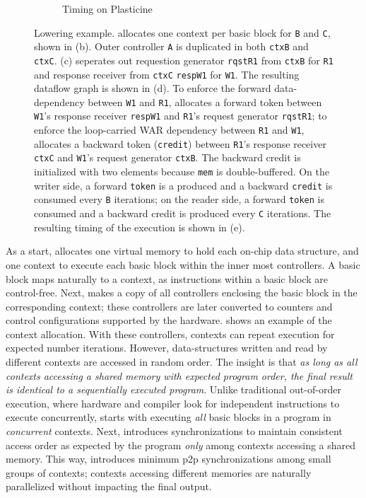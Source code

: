 \begin{figure}
\begin{subfigure}[b]{0.76\textwidth}
\caption{Timing on Plasticine}
\end{subfigure}
\caption[Context allocation]{
  Lowering example.
  \name allocates one context per basic block for \texttt{B} and \texttt{C}, shown in (b). Outer controller \texttt{A} is
  duplicated in both \texttt{ctxB} and \texttt{ctxC}.
  (c) \name seperates out requestion generator \texttt{rqstR1} from \texttt{ctxB} for \texttt{R1} 
  and response receiver from \texttt{ctxC} \texttt{respW1} for \texttt{W1}.
  The resulting dataflow graph is shown in (d). 
  To enforce the forward data-dependency between \texttt{W1} and \texttt{R1}, 
  \name allocates a forward token between \texttt{W1}'s response receiver \texttt{respW1} and
  \texttt{R1}'s request generator \texttt{rqstR1};
  to enforce the loop-carried WAR dependency between \texttt{R1} and \texttt{W1}, \name allocates a
  backward token (\texttt{credit}) between \texttt{R1}'s response receiver \texttt{ctxC} and 
  \texttt{W1}'s request generator \texttt{ctxB}. 
  The backward credit is initialized with two elements because \texttt{mem} is double-buffered.
  On the writer side, a forward \texttt{token} is a
  produced and a backward \texttt{credit} is consumed every \texttt{B} iterations; on the reader
  side, a forward \texttt{token} is consumed and a backward credit is produced every \texttt{C}
  iterations. The resulting timing of the execution is shown in (e).
}
\label{fig:contextalloc}
\end{figure}

As a start, \name allocates one virtual memory to hold each on-chip data structure, and 
one context to execute each basic block within the inner most controllers. 
A basic block maps naturally to a context, as instructions within a basic block are control-free. 
Next, \name makes a copy of all controllers enclosing the basic block in the corresponding context;
these controllers are later converted to counters and control configurations supported by the
hardware. 
 shows an example of the context allocation. 
With these controllers, contexts can repeat execution for expected number iterations. However,
data-structures written and read by different contexts are accessed in random order.
The insight is that \emph{as long as all contexts accessing a shared memory with expected program order,
the final result is identical to a sequentially executed program}.
Unlike traditional out-of-order execution, where hardware and compiler look for independent instructions to
execute concurrently, \name starts with executing \emph{all} basic blocks in a program in \emph{concurrent} contexts.
Next, \name introduces synchronizations to maintain consistent access order as expected by the 
program \emph{only} among contexts accessing a shared memory. 
This way, \name introduces minimum p2p synchronizations among small groups of contexts; contexts
accessing different memories are naturally parallelized without impacting the final output.

